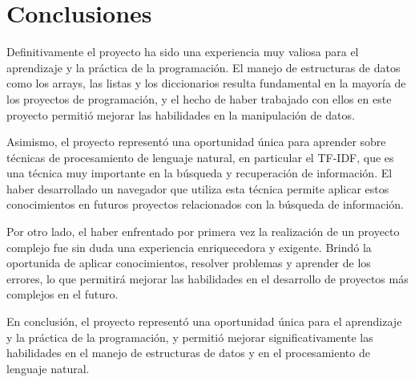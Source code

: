 \documentclass[10pt]{extarticle}
\begin{document}
\newpage
\section{Conclusiones}\label{sec:conclusiones}
Definitivamente el proyecto ha sido una experiencia muy valiosa para el aprendizaje y la práctica de la programación. El manejo de estructuras de datos como los arrays, las listas y los diccionarios resulta fundamental en la mayoría de los proyectos de programación, y el hecho de haber trabajado con ellos en este proyecto permitió mejorar las  habilidades en la manipulación de datos.

Asimismo, el proyecto representó una oportunidad única para aprender sobre técnicas de procesamiento de lenguaje natural, en particular el TF-IDF, que es una técnica muy importante en la búsqueda y recuperación de información. El haber desarrollado un navegador que utiliza esta técnica   permite aplicar estos conocimientos en futuros proyectos relacionados con la búsqueda de información.

Por otro lado, el haber enfrentado por primera vez la realización de un proyecto complejo fue sin duda una experiencia enriquecedora y exigente. Brindó la oportunida de  aplicar conocimientos, resolver problemas y aprender de los errores, lo que permitirá mejorar las habilidades en el desarrollo de proyectos más complejos en el futuro.

En conclusión, el proyecto representó una oportunidad única para el aprendizaje y la práctica de la programación, y permitió  mejorar significativamente las habilidades en el manejo de estructuras de datos y en el procesamiento de lenguaje natural.
\end{document}

